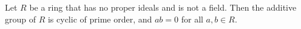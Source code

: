 Let $R$ be a ring that has no proper ideals and is not a field. Then the additive group of $R$ is cyclic of prime order, and $ab = 0$ for all $a, b \in R$.
